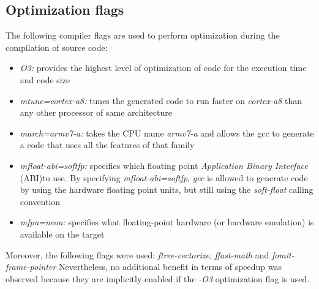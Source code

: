 \subsection{Optimization flags}

The following compiler flags are used to perform optimization during the compilation of source code:

\begin{itemize}
\item{\textit{O3:}} provides the highest level of optimization of code for the execution time and code size
\item{\textit{mtune=cortex-a8:}} tunes the generated code to run faster on \emph{cortex-a8} than any other processor of same architecture
\item{\textit{march=armv7-a:}} takes the CPU name \emph{armv7-a} and allows the gcc to generate a code that uses all the features of that family
\item{\textit{mfloat-abi=softfp:}} specifies which floating point \emph{Application Binary Interface} (ABI)to use. By specifying \emph{mfloat-abi=softfp}, \emph{gcc} is allowed to generate code by using the hardware floating point units, but still using the \emph{soft-float} calling convention
\item{\textit{mfpu=neon:}} specifies what floating-point hardware (or hardware emulation) is available on the target
\end{itemize}

Moreover, the following flags were used: \emph{ftree-vectorize}, \emph{ffast-math} and \emph{fomit-frame-pointer} Nevertheless, no additional benefit in terms of speedup was observed because they are implicitly enabled if the \emph{-O3} optimization flag is used.

